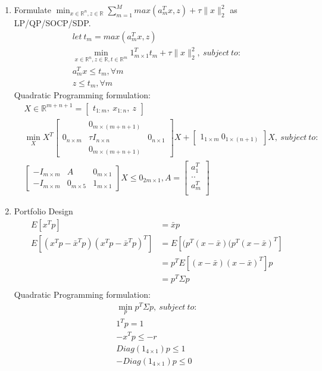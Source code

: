 \documentclass[12pt,letter]{article}
\newcommand{\R}{\mathbb{R}}
\newcommand{\norm}[1]{\|#1\|}
\begin{document}
\begin{enumerate}
\item Formulate $\min_{x\in\R^n, z \in \R} \sum_{m=1}^M max(a_m^Tx, z) + \tau \norm{x}_2^2$ as LP/QP/SOCP/SDP.\\
  \begin{align*}
    let\ t_m = max(a_m^Tx, z)\\
    \min_{x\in\R^n, z \in \R, t\in\R^m} 1_{m\times 1}^T t_m + \tau \norm{x}_2^2,\ subject\ to:\\
    a_m^Tx \leq t_m, \forall m\\
    z \leq t_m, \forall m
  \end{align*}
  Quadratic Programming formulation:
  \begin{align*}
    &X\in\R^{m+n+1} =\begin{bmatrix}t_{1:m},\ x_{1:n},\ z\end{bmatrix}\\
    &\min_{X}
    X^T \begin{bmatrix}
      & 0_{m \times (m+n+1)} &\\
      0_{n\times m} & \tau I_{n\times n} & 0_{n\times 1}\\
      & 0_{m \times (m+n+1)} &
    \end{bmatrix} X +
    \begin{bmatrix}
      1_{1\times m}\ 0_{1\times (n+1)}
    \end{bmatrix}X,\ subject\ to:\\
    &\begin{bmatrix}
      -I_{m \times m} & A & 0_{m \times 1}\\
      -I_{m \times m} & 0_{m \times 5} & 1_{m \times 1}
    \end{bmatrix} X \leq 0_{2m \times 1}, A =\begin{bmatrix}a_1^T\\..\\a_m^T\\\end{bmatrix}
  \end{align*}
  
  \pagebreak
  
\item Portfolio Design\\
  \begin{align*}
    E[x^Tp] &=  \bar{x} p\\
    E[(x^Tp-\bar{x}^Tp)(x^Tp-\bar{x}^Tp)^T] &=  E[(p^T(x-\bar{x})(p^T(x-\bar{x})^T]\\
            &=  p^TE[(x-\bar{x})(x-\bar{x})^T]p\\
            &=  p^T\Sigma p\\
  \end{align*}
  Quadratic Programming formulation:\\
  \begin{align*}
    \min_p p^T \Sigma p,\ subject\ to:\\
    1^T p = 1\\
    -x^Tp \leq -r\\
    Diag(1_{4 \times 1}) p \leq 1\\
    -Diag(1_{4 \times 1}) p \leq 0
  \end{align*}
  

\end{enumerate}
\end{document}
